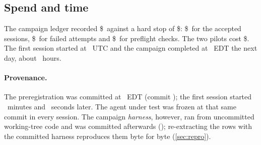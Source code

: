 \subsection{Spend and time}

The campaign ledger recorded \$\SpendLedger\ against a hard stop of \$\SpendBudget: \$\SpendSessions\ for
the accepted sessions, \$\NFailedUSD\ for failed attempts and \$\SpendPreflight\ for preflight checks. The
two pilots cost \$\SpendPilots. The first session started at \FirstStart\ UTC and the campaign completed at
\CompleteEDT\ EDT the next day, about \WallHours\ hours.

\paragraph{Provenance.} The preregistration was committed at \PreregTime\ EDT (commit \code{\PreregSha});
the first session started \PreregGapMin\ minutes and \PreregGapSec\ seconds later. The agent under test was
frozen at that same commit in every session. The campaign \emph{harness}, however, ran from uncommitted
working-tree code and was committed afterwards (\code{\HarnessSha}); re-extracting the rows with the
committed harness reproduces them byte for byte (\cref{sec:repro}).
